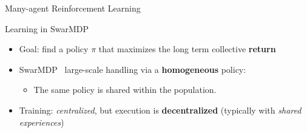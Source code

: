 \documentclass[presentation, 8pt,169]{beamer}\mode<presentation>{\usetheme{AMSBolognaFC}}
\begin{document}
\begin{frame}{Many-agent Reinforcement Learning}
\begin{block}{Learning in SwarMDP}
\begin{itemize}
    \item Goal: find a policy $\pi$ that maximizes the long term collective \textbf{return}
    \item SwarMDP \faArrowRight \, large-scale handling via a \textbf{homogeneous} policy:
      \begin{itemize}
        \item The same policy is shared within the population.
      \end{itemize}
    \item Training: \emph{centralized}, but execution is \textbf{decentralized} (typically with \emph{shared experiences})
  \end{itemize}
\end{block}

\end{frame}
\end{document}
